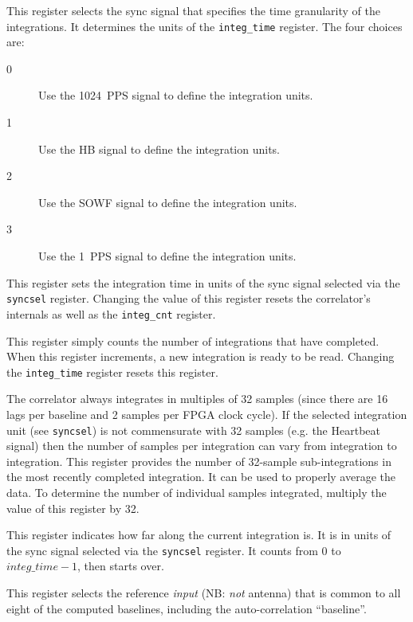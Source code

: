 \documentclass[12pt]{article}
\begin{document}
\begin{description}

 This register selects the sync signal that specifies the time
granularity of the integrations.  It determines the units of the
\verb|integ_time| register.  The four choices are:

\begin{description}
\item[0] Use the 1024~PPS signal to define the integration units.
\item[1] Use the HB signal to define the integration units.
\item[2] Use the SOWF signal to define the integration units.
\item[3] Use the 1~PPS signal to define the integration units.
\end{description}

 This register sets the integration time in units of the
sync signal selected via the \verb|syncsel| register.  Changing the value of
this register resets the correlator's internals as well as the
\verb|integ_cnt| register.

 This register simply counts the number of integrations that
have completed.  When this register increments, a new integration is ready to
be read.  Changing the \verb|integ_time| register resets this register.

 The correlator always integrates in multiples of 32 samples
(since there are 16 lags per baseline and 2 samples per FPGA clock cycle).  If
the selected integration unit (see \verb|syncsel|) is not commensurate with 32
samples (e.g. the Heartbeat signal) then the number of samples per integration
can vary from integration to integration.  This register provides the number of
32-sample sub-integrations in the most recently completed integration.  It can
be used to properly average the data.  To determine the number of individual
samples integrated, multiply the value of this register by 32.

 This register indicates how far along the current
integration is.  It is in units of the sync signal selected via the
\verb|syncsel| register.  It counts from 0 to $integ\_time - 1$, then starts
over.

 This register selects the reference \emph{input} (NB: \emph{not}
antenna) that is common to all eight of the computed baselines, including the
auto-correlation ``baseline''.


\end{description}
\end{document}
